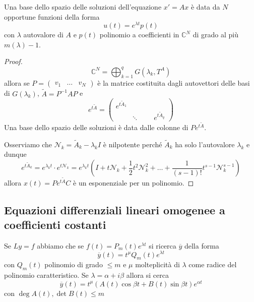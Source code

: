 \begin{theorem}
    Una base dello spazio delle soluzioni dell'equazione \(x' = Ax\) è data da
    \(N\) opportune funzioni della forma
    \[
      u{(t)} = e^{\lambda t}p{(t)}
    \]
    con \(\lambda \) autovalore di \(A\) e \(p{(t)}\) polinomio a coefficienti
    in \(\mathbb{C}^{N}\) di grado al più \(m {(\lambda)} - 1\).
\end{theorem}
\begin{proof}
    \[
      \mathbb{C}^{N} = \bigoplus_{k =1}^{q} G{(\lambda_{k}, T^{A})}
    \]
    allora se \(P = \begin{pmatrix}
        v_{1} & \dots & v_N
    \end{pmatrix}\) è la matrice costituita dagli autovettori delle basi di
    \(G{(\lambda_{k})}\), \(\tilde{A} = P^{-1}AP\) e 
    \[
      e^{t\tilde{A}} = \begin{pmatrix}
          e^{t\tilde{A}_1} &  &  \\
           & \ddots & 
            &  & e^{t\tilde{A}_q}
      \end{pmatrix}
    \] 
    Una base dello spazio delle soluzioni è data dalle colonne di \(P
    e^{t\tilde{A}}\).

    Osserviamo che \(\mathcal{N}_k = \tilde{A}_k - \lambda_{k} I\) è nilpotente
    perché \(\tilde{A}_k\) ha solo l'autovalore \(\lambda_{k}\) e dunque
    \[
      e^{t\tilde{A}_k} = e^{\lambda_{k}t} \cdot e^{t \mathcal{N}_k} =
      e^{\lambda_{k} t}{\left(I + t \mathcal{N}_k + \frac{1}{2}t^2\mathcal{N}^2_k +
      \dots + \frac{1}{(s-1)!}t ^{s-1}\mathcal{N}_k^{s-1}\right)}
    \]
    allora \(x{(t)} = P e ^{t\tilde{A}} C\) è un esponenziale per un polinomio.
\end{proof}


\subsection{Equazioni differenziali lineari omogenee a coefficienti costanti}
Se \(Ly = f\) abbiamo che se \(f{(t)} = P_m{(t)}e ^{\lambda t}\) si ricerca
\(\overline{y}\) della forma
\[
  \overline{y}{(t)} = t ^{\mu} Q_m {(t)} e^{\lambda t}
\]
con \(Q_{m}{(t)}\) polinomio di grado \(\le m\) e \(\mu\) molteplicità di
\(\lambda\) come radice del polinomio caratteristico. Se \(\lambda = \alpha + i
\beta\) allora si cerca
\[
    \overline{y}{(t)} =t ^{\mu} {(A{(t)}\cos \beta t + B{(t)}\sin \beta t)}e^{\alpha t}
\] 
con \(\deg A(t), \det B(t) \le m\) 

